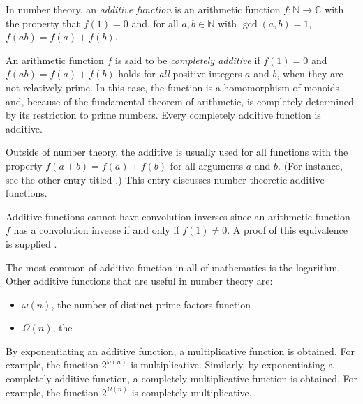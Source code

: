 \documentclass[12pt]{article}
\begin{document}
In number theory, an {\sl additive function\/} is an arithmetic function $f \colon \mathbb{N} \to \mathbb{C}$ with the property that $f(1)=0$ and, for all $a,b \in \mathbb{N}$ with $\gcd(a,b)=1$, $f(ab)=f(a)+f(b)$.

An arithmetic function $f$ is said to be {\sl completely additive\/} if $f(1)=0$ and $f(ab)=f(a)+f(b)$ holds for {\sl all\/} positive integers $a$ and $b$,  when they are not relatively prime. In this case, the function is a homomorphism of monoids and, because of the fundamental theorem of arithmetic, is completely determined by its restriction to prime numbers. Every completely additive function is additive.

Outside of number theory, the  additive is usually used for all functions with the property $f(a+b) = f(a)+f(b)$ for all arguments $a$ and $b$. (For instance, see the other entry titled .) This entry discusses number theoretic additive functions.

Additive functions cannot have convolution inverses since an arithmetic function $f$ has a convolution inverse if and only if $f(1) \neq 0$.  A proof of this equivalence is supplied .

The most common  of additive function in all of mathematics is the logarithm.  Other additive functions that are useful in number theory are:

\begin{itemize}
\item $\omega(n)$, the number of distinct prime factors function
\item $\Omega(n)$, the 
\end{itemize}

By exponentiating an additive function, a multiplicative function is obtained.  For example, the function $\displaystyle 2^{\omega(n)}$ is multiplicative.  Similarly, by exponentiating a completely additive function, a completely multiplicative function is obtained.  For example, the function $\displaystyle 2^{\Omega(n)}$ is completely multiplicative.
\end{document}
